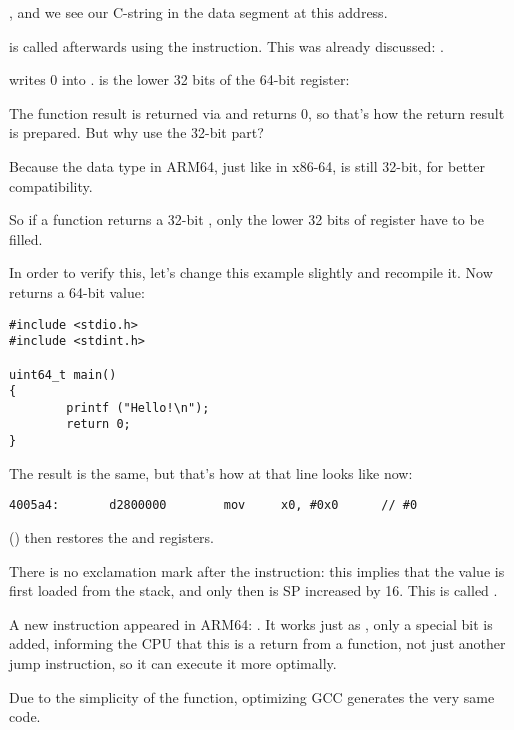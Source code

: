 , and we see our  C-string in the  data segment at this address.


\puts is called afterwards using the  instruction. This was already discussed: .

\MOV writes 0 into . 
 is the lower 32 bits of the 64-bit  register:



The function result is returned via  and \main returns 0, so that's how the return result is prepared.
But why use the 32-bit part?

Because the \Tint data type in ARM64, just like in x86-64, is still 32-bit, for better compatibility.

So if a function returns a 32-bit \Tint, only the lower 32 bits of  register have to be filled.

In order to verify this, let's change this example slightly and recompile it.
Now \main returns a 64-bit value:

\begin{lstlisting}[caption=\main returning a value of \TT{uint64\_t} type,style=customc]
#include <stdio.h>
#include <stdint.h>

uint64_t main()
{
        printf ("Hello!\n");
        return 0;
}
\end{lstlisting}

The result is the same, but that's how \MOV at that line looks like now:

\begin{lstlisting}[caption=\NonOptimizing GCC 4.8.1 + objdump]
  4005a4:       d2800000        mov     x0, #0x0      // #0
\end{lstlisting}


 () then restores the  and  registers.

There is no exclamation mark after the instruction: this implies that the value is first loaded from the stack,
and only then is \ac{SP} increased by 16.
This is called .

A new instruction appeared in ARM64: \RET. 
It works just as , only a special  bit is added, informing the \ac{CPU}
that this is a return from a function, not just another jump instruction, so it can execute it more optimally.

Due to the simplicity of the function, optimizing GCC generates the very same code.
